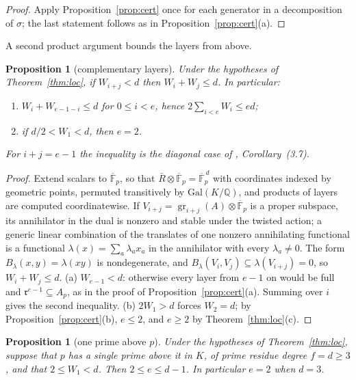 \documentclass[11pt,a4paper]{article}
\newtheorem{proposition}[theorem]{Proposition}
\theoremstyle{definition}
\newcommand{\QQ}{\mathbb{Q}}
\newcommand{\FF}{\mathbb{F}}
\newcommand{\rad}{\mathfrak{r}}
\newcommand{\gr}{\operatorname{gr}}
\begin{document}
\begin{proof}
Apply Proposition~\ref{prop:cert} once for each generator in a decomposition of $\sigma$; the last statement follows as
in Proposition~\ref{prop:cert}(a).
\end{proof}

\noindent A second product argument bounds the layers from above.

\begin{proposition}[complementary layers]\label{prop:mono}
Under the hypotheses of Theorem~\ref{thm:loc}, if $W_{i+j}<d$ then $W_i+W_j\le d$. In particular:
\begin{enumerate}
\item[(a)] $W_i+W_{e-1-i}\le d$ for $0\le i<e$, hence $2\sum_{i<e}W_i\le ed$;
\item[(b)] if $d/2<W_1<d$, then $e=2$.
\end{enumerate}
For $i+j=e-1$ the inequality is the diagonal case of \cite{CDK94}, Corollary~(3.7).
\end{proposition}

\begin{proof}
Extend scalars to $\overline{\FF}_p$, so that $\bar R\otimes\overline{\FF}_p=\overline{\FF}_p^{\,d}$ with coordinates
indexed by geometric points, permuted transitively by $\mathrm{Gal}(K/\QQ)$, and products of layers are computed
coordinatewise. If $V_{i+j}=\gr_{i+j}(A)\otimes\overline{\FF}_p$ is a proper subspace, its annihilator in the dual is
nonzero and stable under the twisted action; a generic linear combination of the translates of one nonzero
annihilating functional is a functional $\lambda(x)=\sum_a\lambda_ax_a$ in the annihilator with every
$\lambda_a\neq0$. The form $B_\lambda(x,y)=\lambda(xy)$ is nondegenerate, and $B_\lambda(V_i,V_j)\subseteq
\lambda(V_{i+j})=0$, so $W_i+W_j\le d$. (a) $W_{e-1}<d$: otherwise every layer from $e-1$ on would be full and
$\rad^{e-1}\subseteq A_p$, as in the proof of Proposition~\ref{prop:cert}(a). Summing over $i$ gives the second
inequality. (b) $2W_1>d$ forces $W_2=d$; by Proposition~\ref{prop:cert}(b), $e\le2$, and $e\ge2$ by
Theorem~\ref{thm:loc}(c).
\end{proof}

\begin{proposition}[one prime above $p$]\label{prop:unprimo}
Under the hypotheses of Theorem~\ref{thm:loc}, suppose that $p$ has a single prime above it in $K$, of prime
residue degree $f=d\ge3$, and that $2\le W_1<d$. Then $2\le e\le d-1$. In particular $e=2$ when $d=3$.
\end{proposition}
\end{document}
